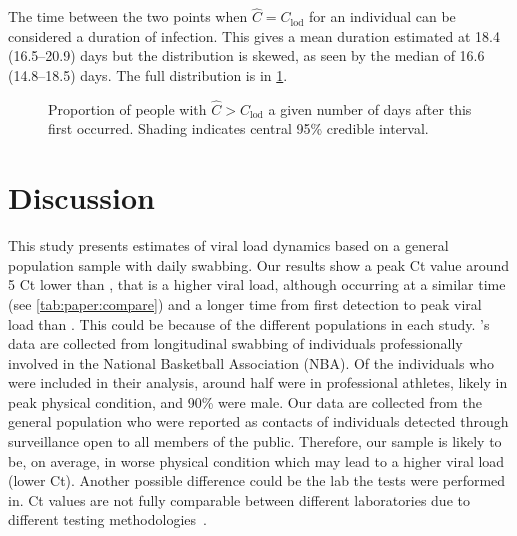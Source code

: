 \documentclass[thesis.tex]{subfiles}
\begin{document}
The time between the two points when $\hat{C} = C_\text{lod}$ for an individual can be considered a duration of infection.
This gives a mean duration estimated at 18.4 (16.5--20.9) days but the distribution is skewed, as seen by the median of 16.6 (14.8--18.5) days.
The full distribution is in \cref{fig:paper:duration}.
\begin{figure}
    \centering
    \caption[Proportion of population positive]{Proportion of people with $\hat{C} > C_\text{lod}$ a given number of days after this first occurred. Shading indicates central 95\% credible interval.}
    \label{fig:paper:duration}
\end{figure}

\section{Discussion}

This study presents estimates of viral load dynamics based on a general population sample with daily swabbing.
Our results show a peak Ct value around 5 Ct lower than \textcite{kisslerViral}, that is a higher viral load, although occurring at a similar time (see \cref{tab:paper:compare}) and a longer time from first detection to peak viral load than \textcite{jonesEstimating}.
This could be because of the different populations in each study. \Textcite{kisslerViral}'s data are collected from longitudinal swabbing of individuals professionally involved in the National Basketball Association (NBA).
Of the individuals who were included in their analysis, around half were in professional athletes, likely in peak physical condition, and 90\% were male.
Our data are collected from the general population who were reported as contacts of individuals detected through surveillance open to all members of the public.
Therefore, our sample is likely to be, on average, in worse physical condition which may lead to a higher viral load (lower Ct).
Another possible difference could be the lab the tests were performed in.
Ct values are not fully comparable between different laboratories due to different testing methodologies~\autocites{dahdouhCt,hanRTPCR}.
\end{document}
